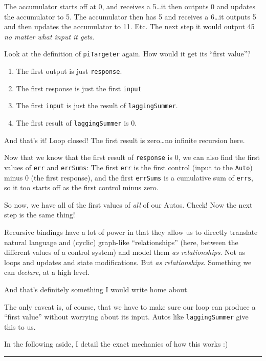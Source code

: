 \documentclass[]{article}
\begin{document}
The accumulator starts off at 0, and receives a 5\ldots it then outputs 0 and
updates the accumulator to 5. The accumulator then has 5 and receives a
6\ldots it outputs 5 and then updates the accumulator to 11. Etc. The next step
it would output 45 \emph{no matter what input it gets}.

Look at the definition of \texttt{piTargeter} again. How would it get its
``first value''?

\begin{enumerate}
\def\labelenumi{\arabic{enumi}.}
\tightlist
\item
  The first output is just \texttt{response}.
\item
  The first response is just the first \texttt{input}
\item
  The first \texttt{input} is just the result of \texttt{laggingSummer}.
\item
  The first result of \texttt{laggingSummer} is 0.
\end{enumerate}

And that's it! Loop closed! The first result is zero\ldots no infinite recursion
here.

Now that we know that the first result of \texttt{response} is 0, we can also
find the first values of \texttt{err} and \texttt{errSums}: The first
\texttt{err} is the first control (input to the \texttt{Auto}) minus 0 (the
first response), and the first \texttt{errSums} is a cumulative sum of
\texttt{errs}, so it too starts off as the first control minus zero.

So now, we have all of the first values of \emph{all} of our Autos. Check! Now
the next step is the same thing!

Recursive bindings have a lot of power in that they allow us to directly
translate natural language and (cyclic) graph-like ``relationships'' (here,
between the different values of a control system) and model them \emph{as
relationships}. Not as loops and updates and state modifications. But \emph{as
relationships}. Something we can \emph{declare}, at a high level.

And that's definitely something I would write home about.

The only caveat is, of course, that we have to make sure our loop can produce a
``first value'' without worrying about its input. Autos like
\texttt{laggingSummer} give this to us.

In the following aside, I detail the exact mechanics of how this works :)

\begin{center}\rule{0.5\linewidth}{0.5pt}\end{center}
\end{document}
